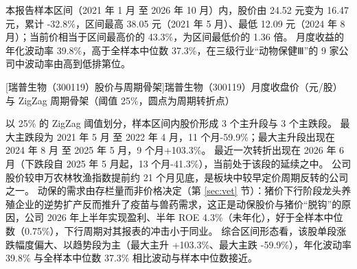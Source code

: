  本报告样本区间（2021 年 1 月 至 2026 年 10 月）内，股价由 24.52 元变为 16.47 元，累计 -32.8\%，区间最高 38.05 元（2021 年 5 月）、最低 12.09 元（2024 年 8 月）；当前价相当于区间最高价的 43.3\%，为区间最低价的 1.36 倍。 月度收益的年化波动率 39.8\%，高于全样本中位数 37.3\%，在三级行业“动物保健Ⅲ”的 9 家公司中波动率由高到低排第位。

\begin{center}
\begin{minipage}{\textwidth}\centering
{}

[瑞普生物（300119）股价与周期骨架]{瑞普生物（300119）月度收盘价（元/股）与 ZigZag 周期骨架（阈值 25\%，圆点为周期转折点）}
\end{minipage}
\end{center}

 以 25\% 的 ZigZag 阈值划分，样本区间内股价形成 3 个主升段与 3 个主跌段。 最大主跌段为 2021 年 5 月 至 2022 年 4 月，11 个月-59.9\%；最大主升段出现在 2024 年 8 月 至 2025 年 5 月，9 个月+103.3\%。 最近一次转折出现在 2026 年 6 月（下跌段自 2025 年 5 月起，13 个月-41.3\%），当前处于该段的延续之中。 公司股价较申万农林牧渔指数提前约 21 个月见底，是板块中较早定价周期反转的公司之一。 动保的需求由存栏量而非价格决定（第 \ref{sec:vet} 节）：猪价下行阶段龙头养殖企业的逆势扩产反而推升了疫苗与兽药需求，这正是动保股价与猪价“脱钩”的原因，公司 2026 年上半年实现盈利、半年 ROE 4.3\%（未年化），好于全样本中位数（0.75\%），下行周期对其报表的冲击小于同业。 综合区间形态看，该股单段涨跌幅度偏大、以趋势段为主（最大主升 +103.3\%、最大主跌 -59.9\%），年化波动率 39.8\% 与全样本中位数 37.3\% 相比波动与样本中位数接近。

